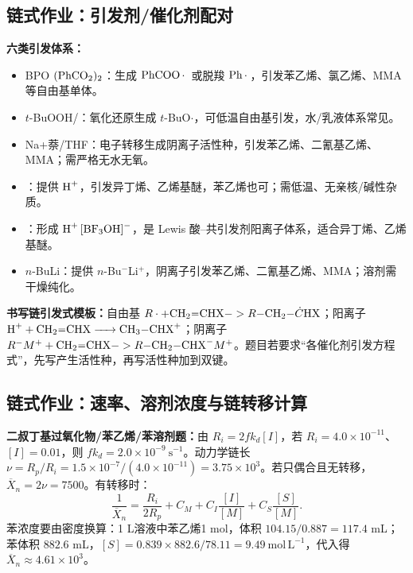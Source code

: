 \documentclass[UTF8,a4paper,10pt,twocolumn]{ctexart}
\newcommand{\Xn}{\overline{X}_n}
\newcommand{\kd}{k_d}
\newcommand{\Rp}{R_p}
\newcommand{\Ri}{R_i}
\begin{document}
\subsection{链式作业：引发剂/催化剂配对}
\begin{exam}
\textbf{六类引发体系：}
\begin{itemize}
  \item BPO $\ce{(PhCO2)2}$：生成 $\ce{PhCOO.}$ 或脱羧 $\ce{Ph.}$，引发苯乙烯、氯乙烯、MMA 等自由基单体。
  \item $t$-BuOOH/：氧化还原生成 $t$-BuO$\cdot$，可低温自由基引发，水/乳液体系常见。
  \item Na+萘/THF：电子转移生成阴离子活性种，引发苯乙烯、二氰基乙烯、MMA；需严格无水无氧。
  \item {}：提供 $\ce{H+}$，引发异丁烯、乙烯基醚，苯乙烯也可；需低温、无亲核/碱性杂质。
  \item {}：形成 $\ce{H+ [BF3OH]-}$，是 Lewis 酸--共引发剂阳离子体系，适合异丁烯、乙烯基醚。
  \item $n$-BuLi：提供 $n$-Bu$^-$Li$^+$，阴离子引发苯乙烯、二氰基乙烯、MMA；溶剂需干燥纯化。
\end{itemize}
\end{exam}
\textbf{书写链引发式模板：}自由基 $R\cdot+\ce{CH2=CHX}->R\ce{-CH2-\dot{C}HX}$；阳离子 $\ce{H+ + CH2=CHX -> CH3-CHX+}$；阴离子 $R^-M^++\ce{CH2=CHX}->R\ce{-CH2-CHX^-}M^+$。题目若要求“各催化剂引发方程式”，先写产生活性种，再写活性种加到双键。

\subsection{链式作业：速率、溶剂浓度与链转移计算}
\begin{examplebox}
\textbf{二叔丁基过氧化物/苯乙烯/苯溶剂题：}由 $\Ri=2f\kd[I]$，若 $\Ri=4.0\times10^{-11}$、$[I]=0.01$，则 $f\kd=2.0\times10^{-9}\ \mathrm{s^{-1}}$。动力学链长 $\nu=\Rp/\Ri=1.5\times10^{-7}/(4.0\times10^{-11})=3.75\times10^3$。若只偶合且无转移，$\Xn=2\nu=7500$。有转移时：
\[
\frac1{\Xn}=\frac{\Ri}{2\Rp}+C_M+C_I\frac{[I]}{[M]}+C_S\frac{[S]}{[M]}.
\]
苯浓度要由密度换算：1 L溶液中苯乙烯1 mol，体积 $104.15/0.887=117.4$ mL；苯体积 $882.6$ mL，$[S]=0.839\times882.6/78.11=9.49\ \mathrm{mol\,L^{-1}}$，代入得 $\Xn\approx4.61\times10^3$。
\end{examplebox}
\end{document}
